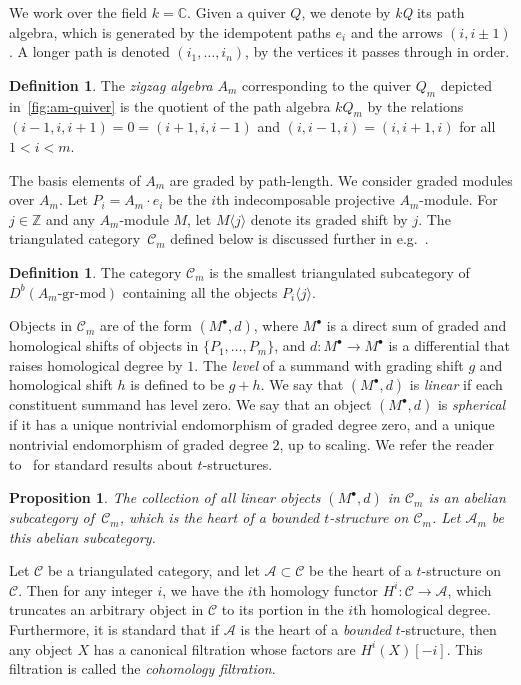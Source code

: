 \documentclass[submission]{FPSAC2025}
\newtheorem{proposition}[theorem]{Proposition}
\theoremstyle{definition}
\newtheorem{definition}[theorem]{Definition}
\newcommand{\darkblue}{\color{darkblue}} %
\newcommand{\defn}[1]{\textsl{\darkblue #1}} %
\begin{document}
We work over the field \(k = \mathbb{C}\).
Given a quiver \(Q\), we denote by \defn{kQ} its path algebra, which is generated by the idempotent paths \(e_i\) and the arrows \((i,i\pm1)\).
A longer path is denoted \((i_1,\ldots,i_n)\), by the vertices it passes through in order.
\begin{definition}
The \defn{zigzag algebra} \(A_m\) corresponding to the quiver \(Q_m\) depicted in~\cref{fig:am-quiver} is the quotient of the path algebra \(kQ_m\) by the relations \((i-1, i, i+1) = 0 = (i+1, i, i-1)\) and \((i, i-1, i) = (i, i+1, i)\) for all~\(1 < i < m\).
\end{definition}
The basis elements of \(A_m\) are graded by path-length.
We consider graded modules over \(A_m\).
Let \(P_i = A_m\cdot e_i\) be the \(i\)th indecomposable projective \(A_m\)-module.
For \(j \in \mathbb{Z}\) and any \(A_m\)-module \(M\), let \(M\langle j \rangle\) denote its graded shift by \(j\).
The triangulated category~\(\mathcal{C}_m\) defined below is discussed further in e.g.~\cite[Sect.~2.3.3]{bap.deo.lic:22}.
\begin{definition}
The category \(\mathcal{C}_m\) is the smallest triangulated subcategory of \(D^b(A_m\text{-gr-mod})\) containing all the objects \(P_i\langle j \rangle\).
\end{definition}
Objects in \(\mathcal{C}_m\) are of the form \((M^{\bullet}, d)\), where \(M^{\bullet}\) is a direct sum of graded and homological shifts of objects in \(\{P_1,\ldots, P_m\}\), and \(d \colon M^{\bullet} \to M^{\bullet}\) is a differential that raises homological degree by \(1\).
The \defn{level} of a summand with grading shift \(g\) and homological shift \(h\) is defined to be \(g+h\).
We say that \((M^{\bullet},d)\) is \defn{linear} if each constituent summand has level zero.
We say that an object \((M^{\bullet},d)\) is \defn{spherical} if it has a unique nontrivial endomorphism of graded degree zero, and a unique nontrivial endomorphism of graded degree \(2\), up to scaling.
We refer the reader to~\cite{bel.ber.del:82} for standard results about \(t\)-structures.
\begin{proposition}
  The collection of all linear objects \((M^{\bullet}, d)\) in \(\mathcal{C}_m\) is an abelian subcategory of~\(\mathcal{C}_m\), which is the heart of a bounded \(t\)-structure on \(\mathcal{C}_m\).
  Let \(\mathcal{A}_m\) be this abelian subcategory.
\end{proposition}

Let \(\mathcal{C}\) be a triangulated category, and let \(\mathcal{A} \subset \mathcal{C}\) be the heart of a \(t\)-structure on \(\mathcal{C}\).
Then for any integer \(i\), we have the \(i\)th homology functor
\(H^i \colon \mathcal {C} \to \mathcal{A}\),
which truncates an arbitrary object in \(\mathcal{C}\) to its portion in the \(i\)th homological degree.
Furthermore, it is standard that if \(\mathcal{A}\) is the heart of a \emph{bounded} \(t\)-structure, then any object \(X\) has a canonical filtration whose factors are \(H^i(X)[-i]\).
This filtration is called the \defn{cohomology filtration}.
\end{document}
